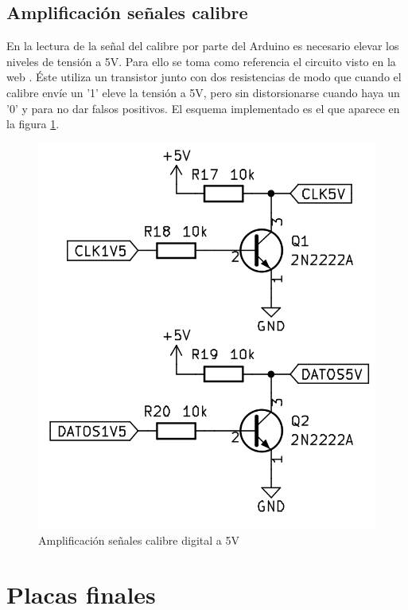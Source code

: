 \subsection{Amplificación señales calibre}

En la lectura de la señal del calibre por parte del Arduino es necesario elevar los niveles de tensión a 5V.
Para ello se toma como referencia el circuito visto en la web \cite{caliper}. Éste utiliza un transistor junto
con dos resistencias de modo que cuando el calibre envíe un '1' eleve la tensión a 5V, pero sin distorsionarse
cuando haya un '0' y para no dar falsos positivos. El esquema implementado es el que aparece en la figura \ref{fig:figura36amp}.

\begin{figure}[hbtp]
    \centering
    \includegraphics[width=\textwidth/2]{03-placa/05-amplificacion-calibre.png}
    \caption{Amplificación señales calibre digital a 5V}
    \label{fig:figura36amp}
    \end{figure}

\section{Placas finales}

